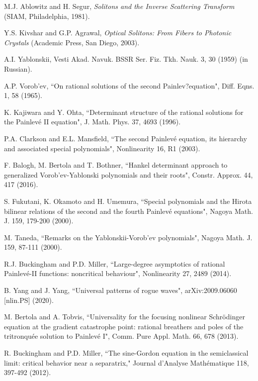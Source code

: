 \documentclass[amsmath,amssymb]{revtex4}
\begin{document}
\begin{thebibliography}{10}
M.J. Ablowitz and H. Segur, \emph{Solitons and the Inverse Scattering Transform} (SIAM, Philadelphia, 1981).

Y.S. Kivshar and G.P. Agrawal, \emph{Optical Solitons: From Fibers to Photonic Crystals}
(Academic Press, San Diego, 2003).

A.I. Yablonskii, Vesti Akad. Navuk. BSSR Ser. Fiz. Tkh. Nauk. 3, 30 (1959) (in Russian).

A.P. Vorob'ev,
``On rational solutions of the second Painlev?equation",
Diff. Eqns. 1, 58 (1965).

K. Kajiwara and Y. Ohta,
``Determinant structure of the rational solutions for the Painlev\'{e} II equation",
J. Math. Phys. 37, 4693 (1996).

P.A. Clarkson and E.L. Mansfield,
``The second Painlev\'{e} equation, its hierarchy and associated special polynomials",
Nonlinearity 16, R1 (2003).

F. Balogh, M. Bertola and T. Bothner,
``Hankel determinant approach to generalized Vorob'ev-Yablonski polynomials and their roots",
Constr. Approx. 44, 417 (2016).

S. Fukutani, K. Okamoto and H. Umemura,
``Special polynomials and the Hirota bilinear relations of the second and the fourth Painlev\'e equations",
Nagoya Math. J. 159, 179-200 (2000).

M. Taneda,
``Remarks on the Yablonskii-Vorob'ev polynomials",
Nagoya Math. J. 159, 87-111 (2000).

R.J. Buckingham and P.D. Miller, ``Large-degree asymptotics of rational
Painlev\'e-II functions: noncritical behaviour", Nonlinearity 27, 2489 (2014).

B. Yang and J. Yang, ``Universal patterns of rogue waves", arXiv:2009.06060 [nlin.PS] (2020).

M. Bertola and A. Tobvis, ``Universality for the focusing nonlinear Schr\"odinger
equation at the gradient catastrophe point: rational breathers and poles of the
tritronqu\'ee solution to Painlev\'e I", Comm. Pure Appl. Math. 66, 678 (2013).

R. Buckingham and P.D. Miller, ``The sine-Gordon equation in the semiclassical limit: critical behavior near a separatrix," Journal d'Analyse Math\'{e}matique 118, 397-492 (2012).

\end{thebibliography}
\end{document}

